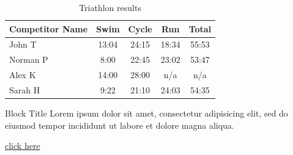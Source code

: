 \documentclass{beamer}
\begin{document}
\begin{table}
	\begin{tabular}{l | c | c | c | c }
		Competitor Name & Swim & Cycle & Run & Total \\
		\hline \hline
		John T & 13:04 & 24:15 & 18:34 & 55:53 \\ 
		Norman P & 8:00 & 22:45 & 23:02 & 53:47\\
		Alex K & 14:00 & 28:00 & n/a & n/a\\
		Sarah H & 9:22 & 21:10 & 24:03 & 54:35 
	\end{tabular}
	\caption{Triathlon results}
\end{table}

\begin{block}{Block Title}
	Lorem ipsum dolor sit amet, consectetur adipisicing elit, 
	sed do eiusmod tempor incididunt ut labore et 
	dolore magna aliqua.
\end{block}
\hyperlink{contents}{click here}
\end{document}
